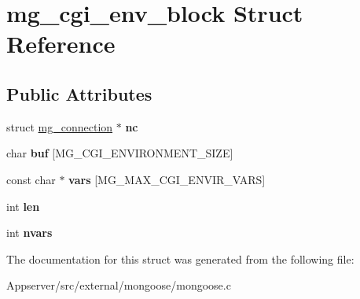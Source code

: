 \hypertarget{structmg__cgi__env__block}{}\section{mg\+\_\+cgi\+\_\+env\+\_\+block Struct Reference}
\label{structmg__cgi__env__block}
\subsection*{Public Attributes}
\begin{DoxyCompactItemize}
\item 
struct \hyperlink{structmg__connection}{mg\+\_\+connection} $\ast$ {\bfseries nc}\hypertarget{structmg__cgi__env__block_a58986a812e02f3e2fa3e57aa0d7fb5fa}{}\label{structmg__cgi__env__block_a58986a812e02f3e2fa3e57aa0d7fb5fa}

\item 
char {\bfseries buf} \mbox{[}M\+G\+\_\+\+C\+G\+I\+\_\+\+E\+N\+V\+I\+R\+O\+N\+M\+E\+N\+T\+\_\+\+S\+I\+ZE\mbox{]}\hypertarget{structmg__cgi__env__block_ab4c9e720bfe5538e00674e669d67acdf}{}\label{structmg__cgi__env__block_ab4c9e720bfe5538e00674e669d67acdf}

\item 
const char $\ast$ {\bfseries vars} \mbox{[}M\+G\+\_\+\+M\+A\+X\+\_\+\+C\+G\+I\+\_\+\+E\+N\+V\+I\+R\+\_\+\+V\+A\+RS\mbox{]}\hypertarget{structmg__cgi__env__block_a21324f3f9e945150326af7e12df961a2}{}\label{structmg__cgi__env__block_a21324f3f9e945150326af7e12df961a2}

\item 
int {\bfseries len}\hypertarget{structmg__cgi__env__block_ad70bd1dda601caced6cff8c23f781489}{}\label{structmg__cgi__env__block_ad70bd1dda601caced6cff8c23f781489}

\item 
int {\bfseries nvars}\hypertarget{structmg__cgi__env__block_aa13725bd59777f69027c5f3b80521a84}{}\label{structmg__cgi__env__block_aa13725bd59777f69027c5f3b80521a84}

\end{DoxyCompactItemize}


The documentation for this struct was generated from the following file\+:\begin{DoxyCompactItemize}
\item 
Appserver/src/external/mongoose/mongoose.\+c\end{DoxyCompactItemize}
